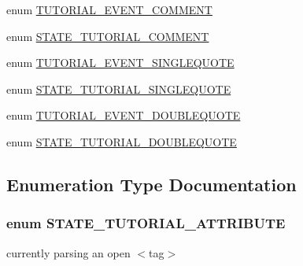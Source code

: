 \begin{DoxyCompactItemize}
\item 
enum \hyperlink{_tutorial_highlight_parser_8inc_a7b99f9f80ccdde6fd9704fd497d95ae4}{\-T\-U\-T\-O\-R\-I\-A\-L\-\_\-\-E\-V\-E\-N\-T\-\_\-\-C\-O\-M\-M\-E\-N\-T} 
\item 
enum \hyperlink{_tutorial_highlight_parser_8inc_a3c8b42fa062042441a226b38a26e69de}{\-S\-T\-A\-T\-E\-\_\-\-T\-U\-T\-O\-R\-I\-A\-L\-\_\-\-C\-O\-M\-M\-E\-N\-T} 
\item 
enum \hyperlink{_tutorial_highlight_parser_8inc_a5c2224a8214608f76a02251d48e15ec8}{\-T\-U\-T\-O\-R\-I\-A\-L\-\_\-\-E\-V\-E\-N\-T\-\_\-\-S\-I\-N\-G\-L\-E\-Q\-U\-O\-T\-E} 
\item 
enum \hyperlink{_tutorial_highlight_parser_8inc_a1fd2baa345ea0cc56e3bfba7201eccda}{\-S\-T\-A\-T\-E\-\_\-\-T\-U\-T\-O\-R\-I\-A\-L\-\_\-\-S\-I\-N\-G\-L\-E\-Q\-U\-O\-T\-E} 
\item 
enum \hyperlink{_tutorial_highlight_parser_8inc_ac2cb4c2fdacea5d677a2e80ac528eb9d}{\-T\-U\-T\-O\-R\-I\-A\-L\-\_\-\-E\-V\-E\-N\-T\-\_\-\-D\-O\-U\-B\-L\-E\-Q\-U\-O\-T\-E} 
\item 
enum \hyperlink{_tutorial_highlight_parser_8inc_a41e917cf8805dcd18975f0d9f782163e}{\-S\-T\-A\-T\-E\-\_\-\-T\-U\-T\-O\-R\-I\-A\-L\-\_\-\-D\-O\-U\-B\-L\-E\-Q\-U\-O\-T\-E} 
\end{DoxyCompactItemize}


\subsection{\-Enumeration \-Type \-Documentation}
\hypertarget{_tutorial_highlight_parser_8inc_a0462abe51fd090700487868ccb0ca2d2}{
\subsubsection[{\-S\-T\-A\-T\-E\-\_\-\-T\-U\-T\-O\-R\-I\-A\-L\-\_\-\-A\-T\-T\-R\-I\-B\-U\-T\-E}]{\setlength{\rightskip}{0pt plus 5cm}enum {\bf \-S\-T\-A\-T\-E\-\_\-\-T\-U\-T\-O\-R\-I\-A\-L\-\_\-\-A\-T\-T\-R\-I\-B\-U\-T\-E}}}\label{_tutorial_highlight_parser_8inc_a0462abe51fd090700487868ccb0ca2d2}
currently parsing an open $<$tag$>$ 

